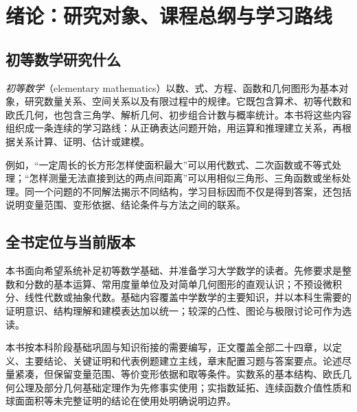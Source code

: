 \chapter*{绪论：研究对象、课程总纲与学习路线}

\section*{初等数学研究什么}
\emph{初等数学}（elementary mathematics）以数、式、方程、函数和几何图形为基本对象，研究数量关系、空间关系以及有限过程中的规律。它既包含算术、初等代数和欧氏几何，也包含三角学、解析几何、初步组合计数与概率统计。本书将这些内容组织成一条连续的学习路线：从正确表达问题开始，用运算和推理建立关系，再根据关系计算、证明、估计或建模。

例如，“一定周长的长方形怎样使面积最大”可以用代数式、二次函数或不等式处理；“怎样测量无法直接到达的两点间距离”可以用相似三角形、三角函数或坐标处理。同一个问题的不同解法揭示不同结构，学习目标因而不仅是得到答案，还包括说明变量范围、变形依据、结论条件与方法之间的联系。

\section*{全书定位与当前版本}
本书面向希望系统补足初等数学基础、并准备学习大学数学的读者。先修要求是整数和分数的基本运算、常用度量单位及对简单几何图形的直观认识；不预设微积分、线性代数或抽象代数。基础内容覆盖中学数学的主要知识，并以本科生需要的证明意识、结构理解和建模表达加以统一；较深的凸性、图论与极限讨论可作为选读。

本书按本科阶段基础巩固与知识衔接的需要编写，正文覆盖全部二十四章，以定义、主要结论、关键证明和代表例题建立主线，章末配置习题与答案要点。论述尽量紧凑，但保留变量范围、等价变形依据和取等条件。实数系的基本结构、欧氏几何公理及部分几何基础定理作为先修事实使用；实指数延拓、连续函数介值性质和球面面积等未完整证明的结论在使用处明确说明边界。

